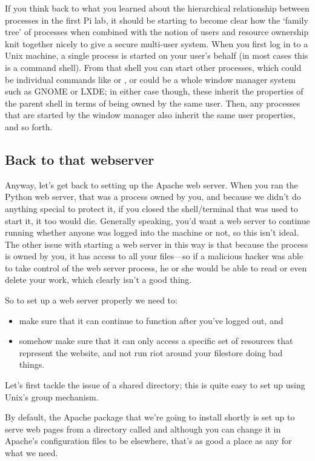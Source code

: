 If you think back to what you learned about the hierarchical relationship between processes in the first Pi lab, it should be starting to become clear how the `family tree' of processes when combined with the notion of users and resource ownership knit together nicely to give a secure multi-user system. When you first log in to a Unix machine, a single process is started on your user's behalf (in most cases this is a command shell). From that shell you can start other processes, which could be individual commands like  or , or could be a whole window manager system such as GNOME or LXDE; in either case though, these inherit the properties of the parent shell in terms of being owned by the same user. Then, any processes that are started by the window manager also inherit the same user properties, and so forth.

\subsection{Back to that webserver}

Anyway, let's get back to setting up the Apache web server. When you ran the Python web server, that was a process owned by you, and because we didn't do anything special to protect it, if you closed the shell/terminal that was used to start it, it too would die. Generally speaking, you'd want a web server to continue running whether anyone was logged into the machine or not, so this isn't ideal. The other issue with starting a web server in this way is that because the process is owned by you, it has access to all your files---so if a malicious hacker was able to take control of the web server process, he or she would be able to read or even delete your work, which clearly isn't a good thing.

So to set up a web server properly we need to:

\begin{itemize}
\item make sure that it can continue to function after you've logged out, and
\item somehow make sure that it can only access a specific set of resources that represent the website, and not run riot around your filestore doing bad things.
\end{itemize}

Let's first tackle the issue of a shared directory; this is quite easy to set up using Unix's group mechanism.

By default, the Apache package that we're going to install shortly is set up to serve web pages from a directory called  and although you can change it in Apache's configuration files to be elsewhere, that's as good a place as any for what we need.

